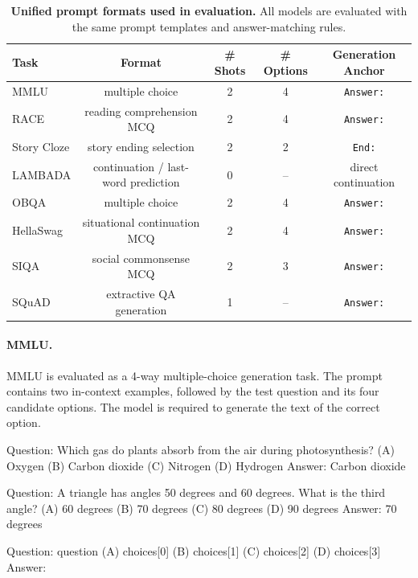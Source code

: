 \begin{table}[t]
\centering
\small
\begin{tabular}{lcccc}
\toprule
Task & Format & \# Shots & \# Options & Generation Anchor \\
\midrule
MMLU        & multiple choice             & 2 & 4 & \texttt{Answer:} \\
RACE        & reading comprehension MCQ   & 2 & 4 & \texttt{Answer:} \\
Story Cloze & story ending selection      & 2 & 2 & \texttt{End:} \\
LAMBADA     & continuation / last-word prediction & 0 & -- & direct continuation \\
OBQA        & multiple choice             & 2 & 4 & \texttt{Answer:} \\
HellaSwag   & situational continuation MCQ & 2 & 4 & \texttt{Answer:} \\
SIQA        & social commonsense MCQ      & 2 & 3 & \texttt{Answer:} \\
SQuAD       & extractive QA generation    & 1 & -- & \texttt{Answer:} \\
\bottomrule
\end{tabular}
\caption{\textbf{Unified prompt formats used in evaluation.} All models are evaluated with the same prompt templates and answer-matching rules.}
\label{tab:prompt_summary}
\end{table}

\paragraph{MMLU.}
MMLU is evaluated as a 4-way multiple-choice generation task. The prompt contains two in-context examples, followed by the test question and its four candidate options. The model is required to generate the text of the correct option.

\begin{promptbox}
Question: Which gas do plants absorb from the air during photosynthesis?
(A) Oxygen
(B) Carbon dioxide
(C) Nitrogen
(D) Hydrogen
Answer: Carbon dioxide

Question: A triangle has angles 50 degrees and 60 degrees. What is the third angle?
(A) 60 degrees
(B) 70 degrees
(C) 80 degrees
(D) 90 degrees
Answer: 70 degrees

Question: {question}
(A) {choices[0]}
(B) {choices[1]}
(C) {choices[2]}
(D) {choices[3]}
Answer:
\end{promptbox}

